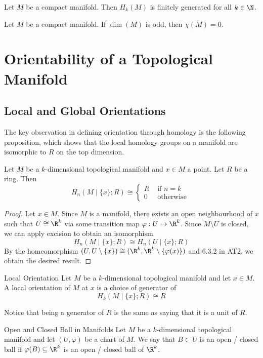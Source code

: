 \documentclass[a4paper]{article}
\begin{document}
\begin{prp}{}{} Let $M$ be a compact manifold. Then $H_k(M)$ is finitely generated for all $k\in\N$. 
\end{prp}

\begin{prp}{}{} Let $M$ be a compact manifold. If $\dim(M)$ is odd, then $\chi(M)=0$. 
\end{prp}

\pagebreak
\section{Orientability of a Topological Manifold}
\subsection{Local and Global Orientations}
The key observation in defining orientation through homology is the following proposition, which shows that the local homology groups on a manifold are isomorphic to $R$ on the top dimension. 

\begin{prp}{}{} Let $M$ be a $k$-dimensional topological manifold and $x\in M$ a point. Let $R$ be a ring. Then $$H_n(M\;|\;\{x\};R)\cong\begin{cases}
R & \text{ if } n=k\\
0 & \text{ otherwise }
\end{cases}$$ \tcbline
\begin{proof}
Let $x\in M$. Since $M$ is a manifold, there exists an open neighbourhood of $x$ such that $U\cong\R^k$ via some transition map $\varphi:U\to\R^k$. Since $M\setminus U$ is closed, we can apply excision to obtain an isomorphism $$H_n(M\;|\;\{x\};R)\cong H_n(U\;|\;\{x\};R)$$ By the homeomorphism $(U,U\setminus\{x\})\cong(\R^k,\R^k\setminus\{\varphi(x)\})$ and 6.3.2 in AT2, we obtain the desired result. 
\end{proof}
\end{prp}

\begin{defn}{Local Orientation}{} Let $M$ be a $k$-dimensional topological manifold and let $x\in M$. A local orientation of $M$ at $x$ is a choice of generator of $$H_k(M\;|\;\{x\};R)\cong R$$
\end{defn}

Notice that being a generator of $R$ is the same as saying that it is a unit of $R$. 

\begin{defn}{Open and Closed Ball in Manifolds}{} Let $M$ be a $k$-dimensional topological manifold and let $(U,\varphi)$ be a chart of $M$. We say that $B\subset U$ is an open / closed ball if $\varphi(B)\subseteq\R^k$ is an open / closed ball of $\R^k$. 
\end{defn}
\end{document}
